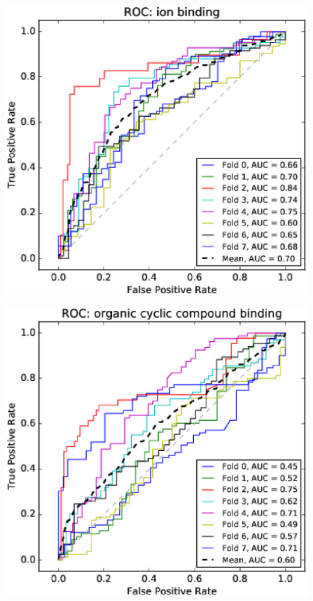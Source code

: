 \documentclass[11pt,twoside,a4paper]{book}
\newenvironment{Figure}
  {\par\medskip\noindent\minipage{\linewidth}}
  {\endminipage\par\medskip}
\begin{document}
\begin{multicols}{2}
\begin{Figure}\begin{center}\includegraphics[width=\linewidth]{figures/roc_ion_binding}\label{fig:roc_ion_binding}\end{center}\end{Figure}
\begin{Figure}\begin{center}\includegraphics[width=\linewidth]{figures/roc_organic_cyclic_compound_binding}\label{fig:roc_organic_cyclic_compound_binding}\end{center}\end{Figure}

\end{multicols}
\end{document}
